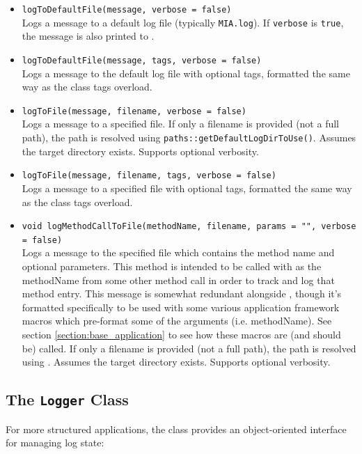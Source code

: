 \begin{itemize}\itemsep0em
	\item \texttt{logToDefaultFile(message, verbose = false)}\\
	Logs a message to a default log file (typically \texttt{MIA.log}). If \texttt{verbose} is \texttt{true}, the message is also printed to .

	\item \texttt{logToDefaultFile(message, tags, verbose = false)}\\
	Logs a message to the default log file with optional tags, formatted the same way as the  class tags overload.

	\item \texttt{logToFile(message, filename, verbose = false)}\\
	Logs a message to a specified file. If only a filename is provided (not a full path), the path is resolved using \texttt{paths::getDefaultLogDirToUse()}. Assumes the target directory exists. Supports optional verbosity.

	\item \texttt{logToFile(message, filename, tags, verbose = false)}\\
	Logs a message to a specified file with optional tags, formatted the same way as the  class tags overload.

 	\item \texttt{void logMethodCallToFile(methodName, filename, params = "", verbose = false)}\\
  	Logs a message to the specified file which contains the method name and optional parameters. This method is intended to be called with  as the methodName from some other method call in order to track and log that method entry. This message is somewhat redundant alongside , though it's formatted specifically to be used with some various application framework macros which pre-format some of the arguments (i.e. methodName). See section \ref{section:base_application} to see how these macros are (and should be) called. If only a filename is provided (not a full path), the path is resolved using . Assumes the target directory exists. Supports optional verbosity.
\end{itemize}

\subsection{The \texttt{Logger} Class}
For more structured applications, the  class provides an object-oriented interface for managing log state:


